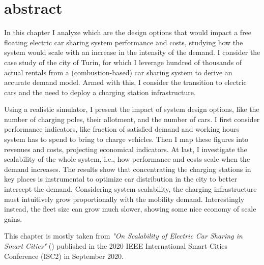 \section{abstract}
\label{sec:10_0_abstract}

In this chapter I analyze which are the design options that would impact a free floating electric car sharing system performance and costs, studying how the system would scale with an increase in the intensity of the demand.
I consider the case study of the city of Turin, for which I leverage hundred of thousands of actual rentals from a (combustion-based) car sharing system to derive an accurate demand model. Armed with this, I consider the transition to  electric cars and the need to deploy a charging station infrastructure.

Using a realistic simulator, I present the impact of system design options, like the number of charging poles, their allotment, and the number of cars. I first consider performance indicators, like fraction of satisfied demand and working hours system has to spend to bring to charge vehicles. Then I map these figures into revenues and costs, projecting economical indicators. 
At last, I investigate the scalability of the whole system, i.e., how performance and costs scale when the demand increases.
The results show that concentrating the charging stations in key places is instrumental to optimize car distribution in the city to better intercept the demand.
Considering system scalability, the charging infrastructure must intuitively grow proportionally with the mobility demand.
Interestingly instead, the fleet size can grow much slower, showing some nice economy of scale gains.

This chapter is mostly taken from \textit{"On Scalability of Electric Car Sharing in Smart Cities"} (\cite{barulli2020scalability}) published in the 2020 IEEE International Smart Cities Conference (ISC2) in September 2020.
